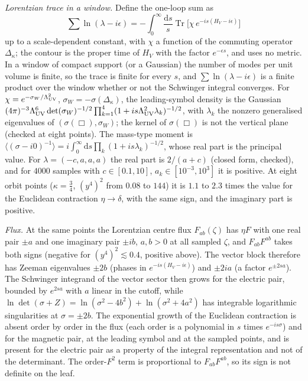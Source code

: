 \emph{Lorentzian trace in a window.} Define the one-loop sum as
\[
\sum\ln(\lambda-i\epsilon)=-\int_0^\infty\frac{\mathrm ds}{s}\operatorname{Tr}\bigl[\chi\,e^{-is(H_V-i\epsilon)}\bigr]
\]
up to a scale-dependent constant, with \(\chi\) a function of the commuting operator \(\Delta_\kappa\); the contour is the proper time of \(H_V\) with the factor \(e^{-\epsilon s}\), and uses no metric. In a window of compact support (or a Gaussian) the number of modes per unit volume is finite, so the trace is finite for every \(s\), and \(\sum\ln(\lambda-i\epsilon)\) is a finite product over the window whether or not the Schwinger integral converges. For \(\chi=e^{-\sigma_W/\Lambda_{\mathrm{UV}}^2}\), \(\sigma_W=-\sigma(\Delta_\kappa)\), the leading-symbol density is the Gaussian \((4\pi)^{-3}\Lambda_{\mathrm{UV}}^6\det(\sigma_W)^{-1/2}\prod_{k=1}^{4}(1+is\Lambda_{\mathrm{UV}}^2\lambda_k)^{-1/2}\), with \(\lambda_k\) the nonzero generalised eigenvalues of \((\sigma(\Box),\sigma_W)\); the kernel of \(\sigma(\Box)\) is not the vertical plane (checked at eight points). The mass-type moment is \(\langle(\sigma-i0)^{-1}\rangle=i\int_0^\infty\mathrm ds\prod_k(1+is\lambda_k)^{-1/2}\), whose real part is the principal value. For \(\lambda=(-c,a,a,a)\) the real part is \(2/(a+c)\) (closed form, checked), and for \(4000\) samples with \(c\in[0.1,10]\), \(a_k\in[10^{-3},10^{3}]\) it is positive. At eight orbit points (\(\kappa=\tfrac34\), \((y^4)^2\) from \(0.08\) to \(144\)) it is \(1.1\) to \(2.3\) times the value for the Euclidean contraction \(\eta\to\delta\), with the same sign, and the imaginary part is positive.

\emph{Flux.} At the same points the Lorentzian centre flux \(F_{ab}(\zeta)\) has \(\eta F\) with one real pair \(\pm a\) and one imaginary pair \(\pm ib\), \(a,b>0\) at all sampled \(\zeta\), and \(F_{ab}F^{ab}\) takes both signs (negative for \((y^4)^2\lesssim0.4\), positive above). The vector block therefore has Zeeman eigenvalues \(\pm2b\) (phases in \(e^{-is(H_V-i\epsilon)}\)) and \(\pm2ia\) (a factor \(e^{\pm2sa}\)). The Schwinger integrand of the vector sector then grows for the electric pair, bounded by \(e^{2sa}\) with \(a\) linear in the cutoff, while \(\ln\det(\sigma+Z)=\ln(\sigma^2-4b^2)+\ln(\sigma^2+4a^2)\) has integrable logarithmic singularities at \(\sigma=\pm2b\). The exponential growth of the Euclidean contraction is absent order by order in the flux (each order is a polynomial in \(s\) times \(e^{-is\sigma}\)) and for the magnetic pair, at the leading symbol and at the sampled points, and is present for the electric pair as a property of the integral representation and not of the determinant. The order-\(F^2\) term is proportional to \(F_{ab}F^{ab}\), so its sign is not definite on the leaf.

